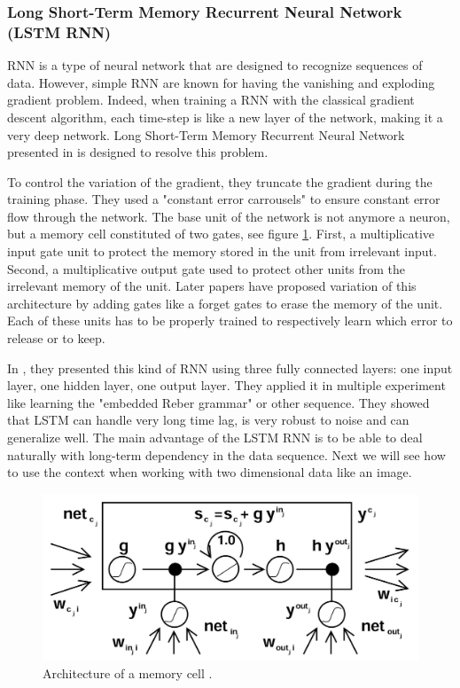 \documentclass[11pt]{sdm}
\begin{document}
\subsubsection{Long Short-Term Memory Recurrent Neural Network (LSTM RNN)}

RNN is a type of neural network that are designed to recognize sequences of data.
However, simple RNN are known for having the vanishing and exploding gradient problem.
Indeed, when training a RNN with the classical gradient descent algorithm, each time-step is like a new layer of the network, making it a very deep network.
Long Short-Term Memory Recurrent Neural Network presented in \cite{hochreiter_long_1997} is designed to resolve this problem.

To control the variation of the gradient, they truncate the gradient during the training phase.
They used a "constant error carrousels" to ensure constant error flow through the network.
The base unit of the network is not anymore a neuron, but a memory cell constituted of two gates, see figure \ref{lstm_unit}.
First, a multiplicative input gate unit to protect the memory stored in the unit from irrelevant input.
Second, a multiplicative output gate used to protect other units from the irrelevant memory of the unit.
Later papers have proposed variation of this architecture by adding gates like a forget gates to erase the memory of the unit.
Each of these units has to be properly trained to respectively learn which error to release or to keep.

In \cite{hochreiter_long_1997}, they presented this kind of RNN using three fully connected layers: one input layer, one hidden layer, one output layer.
They applied it in multiple experiment like learning the "embedded Reber grammar" or other sequence.
They showed that LSTM can handle very long time lag, is very robust to noise and can generalize well.
The main advantage of the LSTM RNN is to be able to deal naturally with long-term dependency in the data sequence.
Next we will see how to use the context when working with two dimensional data like an image.
\begin{figure}[btp]
  \centering
  \includegraphics[scale=1]{img/lstm_unit}
  \caption{\label{lstm_unit} Architecture of a memory cell \cite{hochreiter_long_1997}. }
\end{figure}
\end{document}
